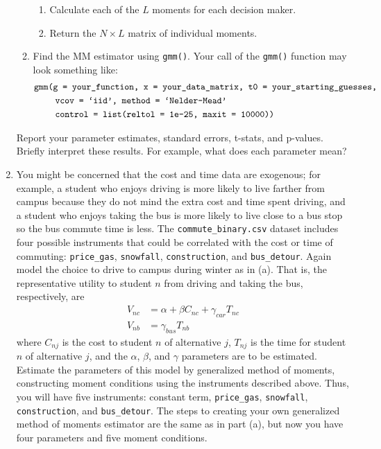 \documentclass[11pt,letterpaper]{article}
\begin{document}
\begin{enumerate}[label=\alph*., leftmargin=*]
\begin{enumerate}[label=\Roman*.]
\begin{enumerate}[label=\roman*.]
			\item Calculate each of the $L$ moments for each decision maker.
			\item Return the $N \times L$ matrix of individual moments.
		\end{enumerate}
		\item Find the MM estimator using \texttt{gmm()}. Your call of the \texttt{gmm()} function may look something like:
		\begin{align*}
			&\text{\texttt{gmm(g = your\_function, x = your\_data\_matrix, t0 = your\_starting\_guesses, }} \\
			&\qquad~ \text{\texttt{vcov = `iid', method = `Nelder-Mead'}} \\
			&\qquad~ \text{\texttt{control = list(reltol = 1e-25, maxit = 10000))}}
		\end{align*}
	\end{enumerate}
	Report your parameter estimates, standard errors, t-stats, and p-values. Briefly interpret these results. For example, what does each parameter mean?

	\item You might be concerned that the cost and time data are exogenous; for example, a student who enjoys driving is more likely to live farther from campus because they do not mind the extra cost and time spent driving, and a student who enjoys taking the bus is more likely to live close to a bus stop so the bus commute time is less. The \texttt{commute\_binary.csv} dataset includes four possible instruments that could be correlated with the cost or time of commuting: \texttt{price\_gas}, \texttt{snowfall}, \texttt{construction}, and \texttt{bus\_detour}. Again model the choice to drive to campus during winter as in (a). That is, the representative utility to student $n$ from driving and taking the bus, respectively, are
	\begin{align*}
		V_{nc} & = \alpha + \beta C_{nc} + \gamma_{car} T_{nc} \\
		V_{nb} & = \gamma_{bus} T_{nb}
	\end{align*}
	where $C_{nj}$ is the cost to student $n$ of alternative $j$, $T_{nj}$ is the time for student $n$ of alternative $j$, and the $\alpha$, $\beta$, and $\gamma$ parameters are to be estimated. Estimate the parameters of this model by generalized method of moments, constructing moment conditions using the instruments described above. Thus, you will have five instruments: constant term, \texttt{price\_gas}, \texttt{snowfall}, \texttt{construction}, and \texttt{bus\_detour}. The steps to creating your own generalized method of moments estimator are the same as in part (a), but now you have four parameters and five moment conditions.


\end{enumerate}
\end{document}

